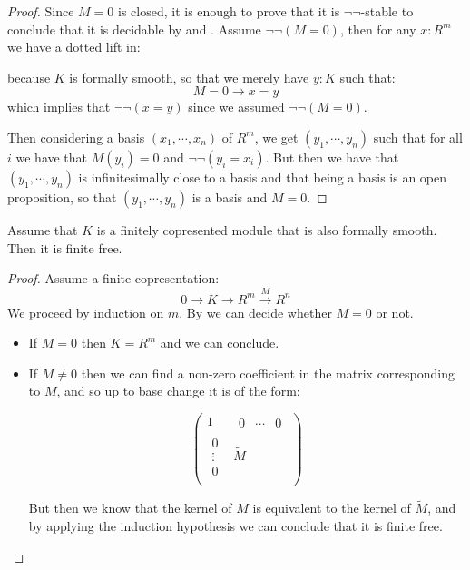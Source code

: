 \begin{proof}
Since $M=0$ is closed, it is enough to prove that it is $\neg\neg$-stable to conclude that it is decidable by  and . Assume $\neg\neg(M=0)$, then for any $x:R^m$ we have a dotted lift in:
 \begin{center}
\end{center}
because $K$ is formally smooth, so that we merely have $y:K$ such that: 
\[M=0\to x=y\]
which implies that $\neg\neg(x=y)$ since we assumed $\neg\neg(M=0)$.

Then considering a basis $(x_1,\cdots,x_n)$ of $R^m$, we get $(y_1,\cdots,y_n)$ such that for all $i$ we have that $M(y_i) = 0$ and $\neg\neg(y_i=x_i)$. But then we have that $(y_1,\cdots,y_n)$ is infinitesimally close to a basis and that being a basis is an open proposition, so that $(y_1,\cdots,y_n)$ is a basis and $M=0$.
\end{proof}

\begin{lemma}\label{smooth-corpresented-implies-free}
Assume that $K$ is a finitely copresented module that is also formally smooth. Then it is finite free.
\end{lemma}

\begin{proof}
Assume a finite copresentation:
\[0\to K\to R^m\overset{M}{\to} R^n\]
We proceed by induction on $m$. By  we can decide whether $M=0$ or not.
\begin{itemize}
\item If $M=0$ then $K=R^m$ and we can conclude.
\item If $M\not=0$ then we can find a non-zero coefficient in the matrix corresponding to $M$, and so up to base change it is of the form:

\[
\begin{pmatrix}
1 & \begin{matrix}0&\cdots & 0\end{matrix}  \\
\begin{matrix}0\\ \vdots\\ 0\end{matrix} & \widetilde{M} \\
\end{pmatrix}
\]

But then we know that the kernel of $M$ is equivalent to the kernel of $\widetilde{M}$, and by applying the induction hypothesis we can conclude that it is finite free.
\end{itemize}
\end{proof}

